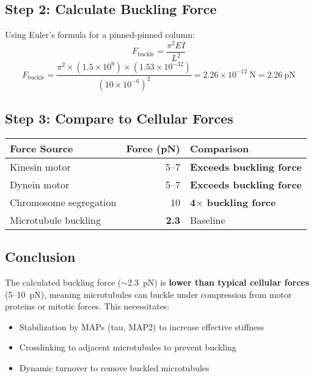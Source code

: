 \subsection*{Step 2: Calculate Buckling Force}

Using Euler's formula for a pinned-pinned column:
\begin{equation}
F_{\mathrm{buckle}} = \frac{\pi^2 EI}{L^2}
\end{equation}
\begin{equation}
F_{\mathrm{buckle}} = \frac{\pi^2 \times (1.5 \times 10^9) \times (1.53 \times 10^{-32})}{(10 \times 10^{-6})^2} = 2.26 \times 10^{-12}\ \mathrm{N} = 2.26\ \mathrm{pN}
\end{equation}

\subsection*{Step 3: Compare to Cellular Forces}

\begin{center}
\begin{tabular}{@{}lrl@{}}
\toprule
Force Source & \multicolumn{1}{c}{Force (pN)} & Comparison \\
\midrule
Kinesin motor & 5--7 & \textbf{Exceeds buckling force} \\
Dynein motor & 5--7 & \textbf{Exceeds buckling force} \\
Chromosome segregation & 10 & \textbf{4$\times$ buckling force} \\
Microtubule buckling & \textbf{2.3} & Baseline \\
\bottomrule
\end{tabular}
\end{center}

\subsection*{Conclusion}

The calculated buckling force ($\sim$2.3~pN) is \textbf{lower than typical cellular forces} (5--10~pN), meaning microtubules can buckle under compression from motor proteins or mitotic forces. This necessitates:
\begin{itemize}
\item Stabilization by MAPs (tau, MAP2) to increase effective stiffness
\item Crosslinking to adjacent microtubules to prevent buckling
\item Dynamic turnover to remove buckled microtubules
\end{itemize}

